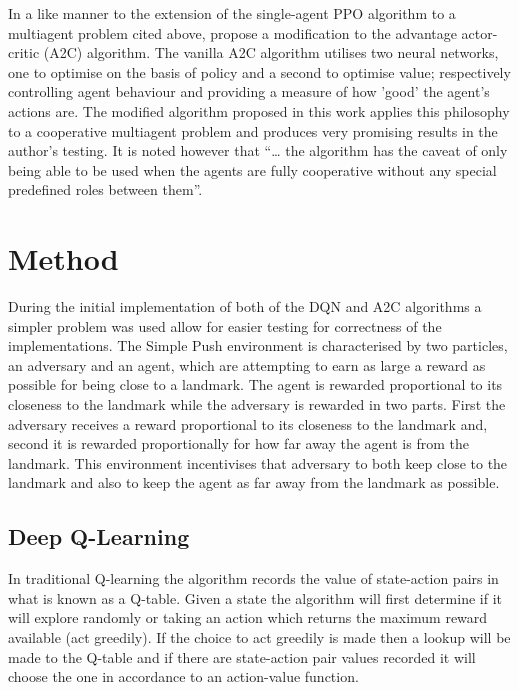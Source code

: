 \documentclass{article}
\begin{document}
In a like manner to the extension of the single-agent PPO algorithm to a multiagent problem cited above, \citet{9263738} propose a modification to the advantage actor-critic (A2C) algorithm.
The vanilla A2C algorithm utilises two neural networks, one to optimise on the basis of policy and a second to optimise value; respectively controlling agent behaviour and providing a measure of how 'good' the agent's actions are.
The modified algorithm proposed in this work applies this philosophy to a cooperative multiagent problem and produces very promising results in the author's testing.
It is noted however that “… the algorithm has the caveat of only being able to be used when the agents are fully cooperative without any special predefined roles between them”. \citet{terry2020pettingzoo}

\section{Method} \label{Method}

During the initial implementation of both of the DQN and A2C algorithms a simpler problem was used allow for easier testing for correctness of the implementations.
The Simple Push environment is characterised by two particles, an adversary and an agent, which are attempting to earn as large a reward as possible for being close to a landmark.
The agent is rewarded proportional to its closeness to the landmark while the adversary is rewarded in two parts.
First the adversary receives a reward proportional to its closeness to the landmark and, second it is rewarded proportionally for how far away the agent is from the landmark.
This environment incentivises that adversary to both keep close to the landmark and also to keep the agent as far away from the landmark as possible.

\subsection{Deep Q-Learning} \label{DQN-Method}

In traditional Q-learning the algorithm records the value of state-action pairs in what is known as a Q-table.
Given a state the algorithm will first determine if it will explore randomly or taking an action which returns the maximum reward available (act greedily).
If the choice to act greedily is made then a lookup will be made to the Q-table and if there are state-action pair values recorded it will choose the one in accordance to an action-value function.
\end{document}
